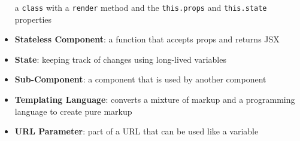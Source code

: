 \begin{itemize}[leftmargin=*]
        a \texttt{class} with a \texttt{render} method and the \texttt{this.props} and \texttt{this.state} properties
    \item
        \textbf{Stateless Component}:
        a function that accepts props and returns JSX
    \item
        \textbf{State}:
        keeping track of changes using long-lived variables
    \item
        \textbf{Sub-Component}:
        a component that is used by another component
    \item
        \textbf{Templating Language}:
        converts a mixture of markup and a programming language to create pure markup
    \item
        \textbf{URL Parameter}:
        part of a URL that can be used like a variable
\end{itemize}
